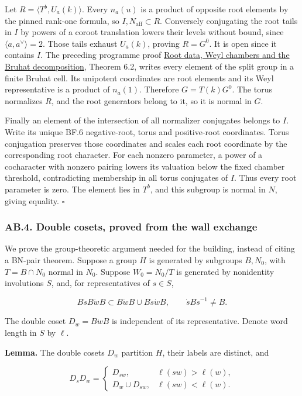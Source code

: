 \documentclass[
  11pt,
]{article}
\begin{document}
Let \(R=\langle T^b,U_a(k)\rangle\). Every \(n_a(u)\) is a product of
opposite root elements by the pinned rank-one formula, so
\(I,N_{\mathrm{aff}}\subset R\). Conversely conjugating the root tails
in \(I\) by powers of a coroot translation lowers their levels without
bound, since \(\langle a,a^\vee\rangle=2\). Those tails exhaust
\(U_a(k)\), proving \(R=G^0\). It is open since it contains \(I\). The
preceding programme proof \href{../AG-RG/AG-RG-04.html}{Root data, Weyl
chambers and the Bruhat decomposition}, Theorem 6.2, writes every
element of the split group in a finite Bruhat cell. Its unipotent
coordinates are root elements and its Weyl representative is a product
of \(n_a(1)\). Therefore \(G=T(k)G^0\). The torus normalizes \(R\), and
the root generators belong to it, so it is normal in \(G\).

Finally an element of the intersection of all normalizer conjugates
belongs to \(I\). Write its unique BF.6 negative-root, torus and
positive-root coordinates. Torus conjugation preserves those coordinates
and scales each root coordinate by the corresponding root character. For
each nonzero parameter, a power of a cocharacter with nonzero pairing
lowers its valuation below the fixed chamber threshold, contradicting
membership in all torus conjugates of \(I\). Thus every root parameter
is zero. The element lies in \(T^b\), and this subgroup is normal in
\(N\), giving equality. \(\square\)

\subsubsection{AB.4. Double cosets, proved from the wall
exchange}\label{ab.4.-double-cosets-proved-from-the-wall-exchange}

We prove the group-theoretic argument needed for the building, instead
of citing a BN-pair theorem. Suppose a group \(H\) is generated by
subgroups \(B,N_0\), with \(T=B\cap N_0\) normal in \(N_0\). Suppose
\(W_0=N_0/T\) is generated by nonidentity involutions \(S\), and, for
representatives of \(s\in S\),

\[
 B\dot s B\dot w B\subset B\dot w B\cup B\dot s\dot w B,
 \qquad \dot s B\dot s^{-1}\ne B.
 \tag{AB.9}
\]

The double coset \(D_w=B\dot wB\) is independent of its representative.
Denote word length in \(S\) by \(\ell\).

\textbf{Lemma.} The double cosets \(D_w\) partition \(H\), their labels
are distinct, and

\[
 D_sD_w=
 \begin{cases}
 D_{sw},&\ell(sw)>\ell(w),\\
 D_w\cup D_{sw},&\ell(sw)<\ell(w).
 \end{cases}
 \tag{AB.10}
\]
\end{document}
